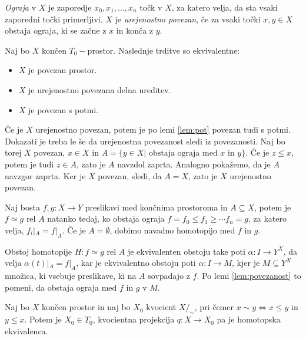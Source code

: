 \documentclass[mat1]{fmfdelo}
\begin{document}
\emph{Ograja} v $X$ je zaporedje $x_0,x_1, \ldots ,x_n$ točk v $X$, za katero velja, da sta vsaki zaporedni točki primerljivi. $X$ je \emph{urejenostno povezan}, če za vsaki točki $x,y\in X$ obstaja ograja, ki se začne z $x$ in konča z $y$.
\begin{lema}
    Naj bo $X$ končen $T_0-$prostor. Naslednje trditve so ekvivalentne:

    \begin{itemize}
        \item $X$ je povezan prostor.
        \item $X$ je urejenostno povezana delna ureditev.
        \item $X$ je povezan s potmi.
    \end{itemize}
    \label{lem:povezanost}
\end{lema}


\begin{dokaz}
    Če je $X$ urejenostno povezan, potem je po lemi \ref{lem:pot} povezan tudi s potmi.
    Dokazati je treba le še da urejenostna povezanost sledi iz povezanosti. Naj bo torej $X$ povezan, $x\in X$ in $A=\{y\in X| \text{ obstaja ograja med $x$ in $y$}\}$. Če 
    je $z\leq x$, potem je tudi $z\in A$, zato je $A$ navzdol zaprta. Analogno pokažemo, da je $A$ navzgor zaprta. Ker je $X$ povezan, sledi, da $A=X$, zato je $X$ urejenostno povezan.
\end{dokaz}

\begin{trditev}
    Naj bosta $f,g\colon  X\rightarrow Y$ preslikavi med končnima prostoroma in $A\subseteq X$, potem je $f\simeq g$ rel $A$ natanko tedaj, ko obstaja ograja $f=f_0\leq f_1\geq  \cdots  f_n=g$, za katero velja, $f_i|_A=f|_A$. Če je $A=\emptyset$, dobimo navadno homotopijo med $f$ in $g$.
    \label{iz:ograje}
\end{trditev}

\begin{dokaz}
    Obstoj homotopije $H\colon f\simeq g$ rel $A$ je ekvivalenten obstoju take poti $\alpha\colon  I \rightarrow Y^X$, da velja $\alpha(t)|_A=f|_A$, kar je ekvivalentno obstoju poti 
    $\alpha\colon  I \rightarrow M$, kjer je $M\subseteq Y^X$ množica, ki vsebuje preslikave, ki na $A$ sovpadajo z $f$. Po lemi \ref{lem:povezanost} to pomeni, da obstaja ograja 
    med $f$ in $g$ v $M$.
\end{dokaz}


\begin{trditev}
    Naj bo $X$ končen prostor in naj bo $X_0$ kvocient $X/_\sim$, pri čemer $x\sim y \Leftrightarrow x\le y$ in $y\le x$. Potem je $X_0\in T_0$, kvocientna projekcija $q\colon X\rightarrow X_0$ pa je homotopska ekvivalenca.
\end{trditev}
\end{document}
